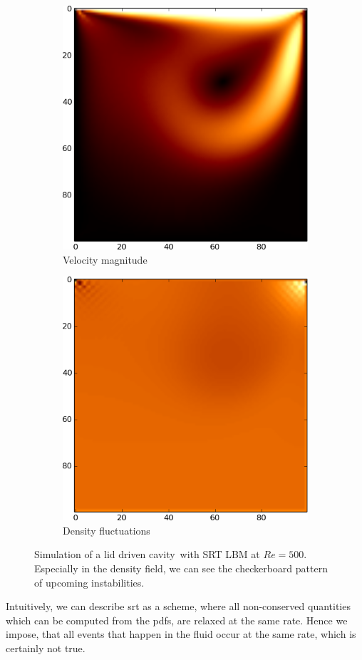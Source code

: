 \begin{figure}
\centering
\begin{subfigure}{.5\textwidth}
\label{fig: velocity SRT}
  \centering
  \includegraphics[width=0.8\linewidth]{../figures/ldc_re500_vel2_0019_trim.png} %
  \caption{Velocity magnitude }
\end{subfigure}%
\begin{subfigure}{.5\textwidth}
\label{fig: density SRT}
  \centering
  \includegraphics[width=0.8\linewidth]{../figures/ldc_re500_rho2_0019_trim.png} %
  \caption{Density fluctuations}
\end{subfigure}
\caption[Lid driven cavity]{Simulation of a lid driven cavity\protect\footnotemark\ with SRT LBM at $Re=500$. Especially in the density field, we can see the checkerboard pattern of upcoming instabilities.}
\label{fig: spurious modes SRT}
\end{figure}
Intuitively, we can describe \gls{srt} as a scheme, where all non-conserved quantities which can be computed from the \glspl{pdf}, are relaxed at the same rate.
Hence we impose, that all events that happen in the fluid occur at the same rate, which is certainly not true.

